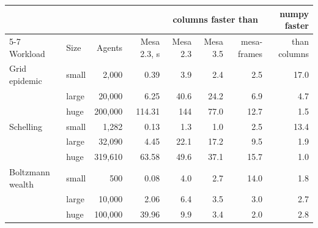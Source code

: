 \begin{tabular}{llrrrrrr}
\toprule
 & & & & \multicolumn{3}{c}{columns faster than} & numpy faster \\ \cmidrule(lr){5-7} Workload & Size & Agents & Mesa 2.3, s & Mesa 2.3 & Mesa 3.5 & mesa-frames & than columns \\
\midrule
Grid epidemic & small & 2{,}000 & 0.39 & 3.9 & 2.4 & 2.5 & 17.0 \\
 & large & 20{,}000 & 6.25 & 40.6 & 24.2 & 6.9 & 4.7 \\
 & huge & 200{,}000 & 114.31 & 144 & 77.0 & 12.7 & 1.5 \\
\addlinespace
Schelling & small & 1{,}282 & 0.13 & 1.3 & 1.0 & 2.5 & 13.4 \\
 & large & 32{,}090 & 4.45 & 22.1 & 17.2 & 9.5 & 1.9 \\
 & huge & 319{,}610 & 63.58 & 49.6 & 37.1 & 15.7 & 1.0 \\
\addlinespace
Boltzmann wealth & small & 500 & 0.08 & 4.0 & 2.7 & 14.0 & 1.8 \\
 & large & 10{,}000 & 2.06 & 6.4 & 3.5 & 3.0 & 2.7 \\
 & huge & 100{,}000 & 39.96 & 9.9 & 3.4 & 2.0 & 2.8 \\
\bottomrule
\end{tabular}
